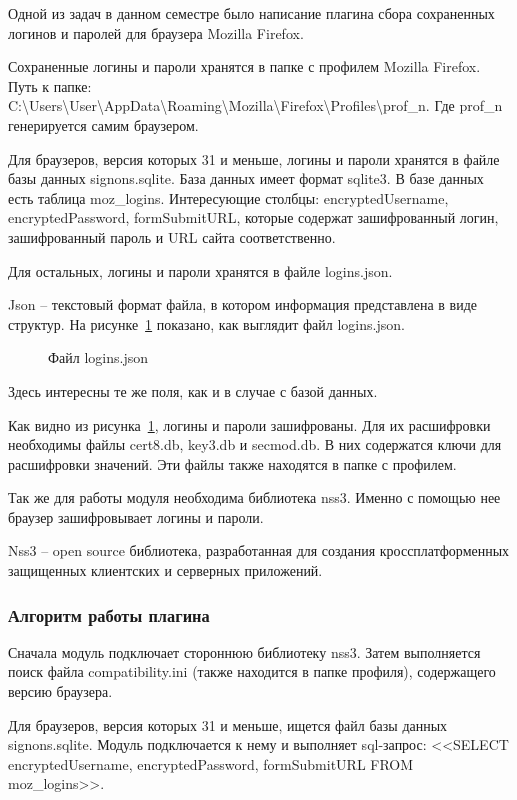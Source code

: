 Одной из задач в данном семестре было написание плагина сбора сохраненных логинов и паролей для браузера Mozilla Firefox.

Сохраненные логины и пароли хранятся в папке с профилем Mozilla Firefox. Путь к папке: C:\textbackslash Users\textbackslash User\textbackslash AppData\textbackslash Roaming\textbackslash Mozilla\textbackslash Firefox\textbackslash Profiles\textbackslash prof\_n. Где prof\_n генерируется самим браузером.

Для браузеров, версия которых 31 и меньше, логины и пароли хранятся в файле базы данных signons.sqlite. База данных имеет формат sqlite3. В базе данных есть таблица moz\_logins. Интересующие столбцы: encryptedUsername, encryptedPassword, formSubmitURL, которые содержат зашифрованный логин, зашифрованный пароль и URL сайта соответственно.

Для остальных, логины и пароли хранятся в файле logins.json.

Json – текстовый формат файла, в котором информация представлена в виде структур. На рисунке~\ref{teresh_1:teresh_1} показано, как выглядит файл logins.json.

\begin{figure}[h!]
\caption{Файл logins.json}
\label{teresh_1:teresh_1}
\end{figure}

Здесь интересны те же поля, как и в случае с базой данных.

Как видно из рисунка~\ref{teresh_1:teresh_1}, логины и пароли зашифрованы. Для их расшифровки необходимы файлы cert8.db, key3.db и secmod.db. В них содержатся ключи для расшифровки значений. Эти файлы также находятся в папке с профилем.

Так же для работы модуля необходима библиотека nss3. Именно с помощью нее браузер зашифровывает логины и пароли.

Nss3 – open source библиотека, разработанная для создания кроссплатформенных защищенных клиентских и серверных приложений.

\subsubsection{Алгоритм работы плагина}

Сначала модуль подключает стороннюю библиотеку nss3. Затем выполняется поиск файла compatibility.ini (также находится в папке профиля), содержащего версию браузера.

Для браузеров, версия которых 31 и меньше, ищется файл базы данных signons.sqlite. Модуль подключается к нему и выполняет sql-запрос: <<SELECT encryptedUsername, encryptedPassword, formSubmitURL FROM moz\_logins>>.


